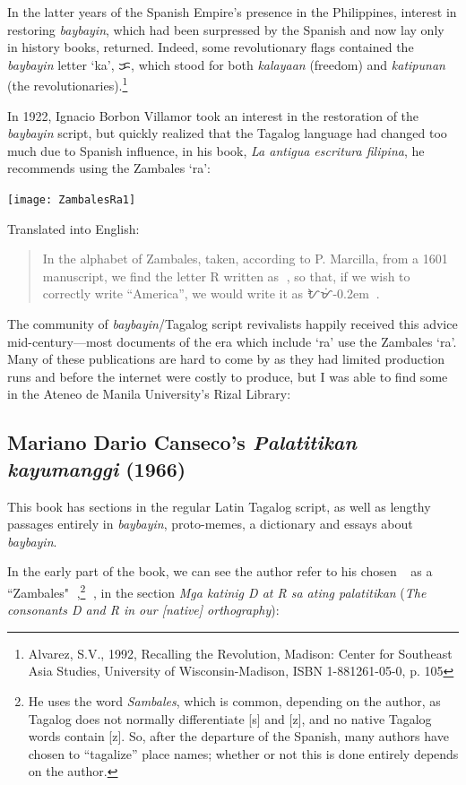 \documentclass[a4paper,pagesize,openany,14pt,parskip=never]{scrbook}
\newcommand{\≈}{$\approx$}
\newcommand{\ra}{{\baybayin ᜍ}}
\begin{document}
In the latter years of the Spanish Empire's presence in the Philippines, interest in restoring {\em baybayin}, which had been surpressed by the Spanish and now lay only in history books, returned. Indeed, some revolutionary flags contained the {\em baybayin} letter `ka', {\baybayin ᜃ}, which stood for both {\em kalayaan} (freedom) and {\em katipunan} (the revolutionaries).\footnote{Alvarez, S.V., 1992, Recalling the Revolution, Madison: Center for Southeast Asia Studies, University of Wisconsin-Madison, ISBN 1-881261-05-0, p. 105} 

In 1922, Ignacio Borbon Villamor took an interest in the restoration of the {\em baybayin} script, but quickly realized that the Tagalog language had changed too much due to Spanish influence, in his book, {\em La antigua escritura filipina}, he recommends using the Zambales `ra':

\texttt{[image: ZambalesRa1]}

Translated into English:

\begin{quote}
    In the alphabet of Zambales, taken, according to P. Marcilla, from a 1601 manuscript, we find the letter R written as {\baybayinh ᜍ}, so that, if we wish to correctly write ``America'', we would write it as {\baybayinh ᜀᜋᜒ\kern-0.2emᜍᜒᜃ}.
\end{quote}

The community of {\em baybayin}/Tagalog script revivalists happily received this advice mid-century---most documents of the era which include `ra' use the Zambales `ra'. Many of these publications are hard to come by as they had limited production runs and before the internet were costly to produce, but I was able to find some in the Ateneo de Manila University's Rizal Library:
\newpage
\subsection{Mariano Dario Canseco's {\em Palatitikan kayumanggi} (1966)}
This book has sections in the regular Latin Tagalog script, as well as lengthy passages entirely in {\em baybayin}, proto-memes, a dictionary and essays about {\em baybayin}.

In the early part of the book, we can see the author refer to his chosen \ra\ as a ``Zambales" \ra,\footnote{He uses the word {\em Sambales}, which is common, depending on the author, as Tagalog does not normally differentiate [s] and [z], and no native Tagalog words contain [z]. So, after the departure of the Spanish, many authors have chosen to ``tagalize'' place names; whether or not this is done entirely depends on the author.} {\baybayinh ᜍ}, in the section {\em Mga katinig D at R sa ating palatitikan} ({\em The consonants D and R in our [native] orthography}):
\end{document}

